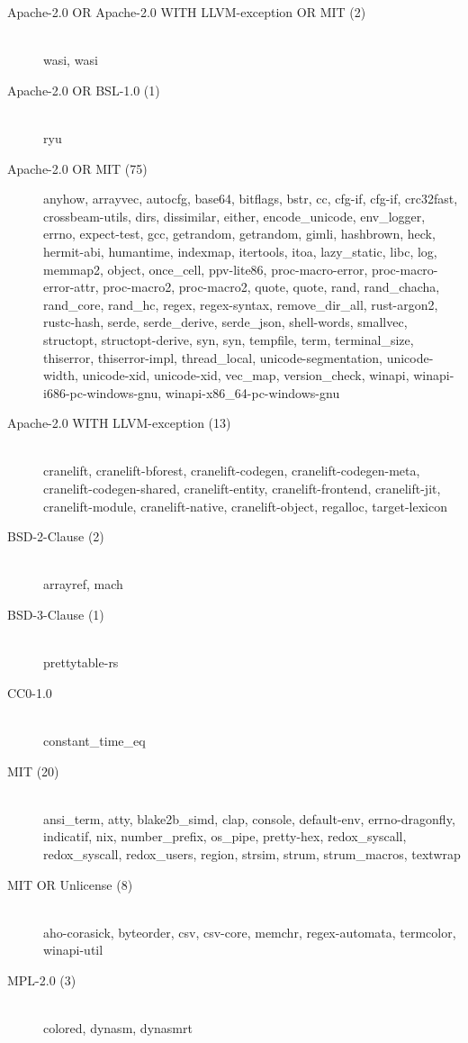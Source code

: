 \begin{description}
    \item[Apache-2.0 OR Apache-2.0 WITH LLVM-exception OR MIT (2)] \hfill \\ wasi, wasi
    \item[Apache-2.0 OR BSL-1.0 (1)] \hfill \\ ryu
    \item[Apache-2.0 OR MIT (75)] anyhow, arrayvec, autocfg, base64, bitflags, bstr, cc,
          cfg-if, cfg-if, crc32fast, crossbeam-utils, dirs, dissimilar, either, encode\_unicode,
          env\_logger,
          errno, expect-test, gcc, getrandom, getrandom, gimli, hashbrown, heck, hermit-abi,
          humantime,
          indexmap, itertools, itoa, lazy\_static, libc, log, memmap2, object, once\_cell,
          ppv-lite86,
          proc-macro-error, proc-macro-error-attr, proc-macro2, proc-macro2, quote, quote, rand,
          rand\_chacha, rand\_core, rand\_hc, regex, regex-syntax, remove\_dir\_all, rust-argon2,
          rustc-hash,
          serde, serde\_derive, serde\_json, shell-words, smallvec, structopt, structopt-derive,
          syn, syn,
          tempfile, term, terminal\_size, thiserror, thiserror-impl, thread\_local,
          unicode-segmentation,
          unicode-width, unicode-xid, unicode-xid, vec\_map, version\_check, winapi,
          winapi-i686-pc-windows-gnu, winapi-x86\_64-pc-windows-gnu
    \item[Apache-2.0 WITH LLVM-exception (13)] \hfill \\ cranelift, cranelift-bforest,
          cranelift-codegen,
          cranelift-codegen-meta, cranelift-codegen-shared, cranelift-entity, cranelift-frontend,
          cranelift-jit, cranelift-module, cranelift-native, cranelift-object, regalloc,
          target-lexicon
    \item[BSD-2-Clause (2)] \hfill \\ arrayref, mach
    \item[BSD-3-Clause (1)] \hfill \\ prettytable-rs
    \item[CC0-1.0] \hfill \\ constant\_time\_eq
    \item[MIT (20)] \hfill \\ ansi\_term, atty, blake2b\_simd, clap, console, default-env,
          errno-dragonfly, indicatif, nix, number\_prefix, os\_pipe, pretty-hex, redox\_syscall,
          redox\_syscall, redox\_users, region, strsim, strum, strum\_macros, textwrap
    \item[MIT OR Unlicense (8)] \hfill \\ aho-corasick, byteorder, csv, csv-core, memchr,
          regex-automata, termcolor, winapi-util
    \item[MPL-2.0 (3)] \hfill \\ colored, dynasm, dynasmrt
\end{description}